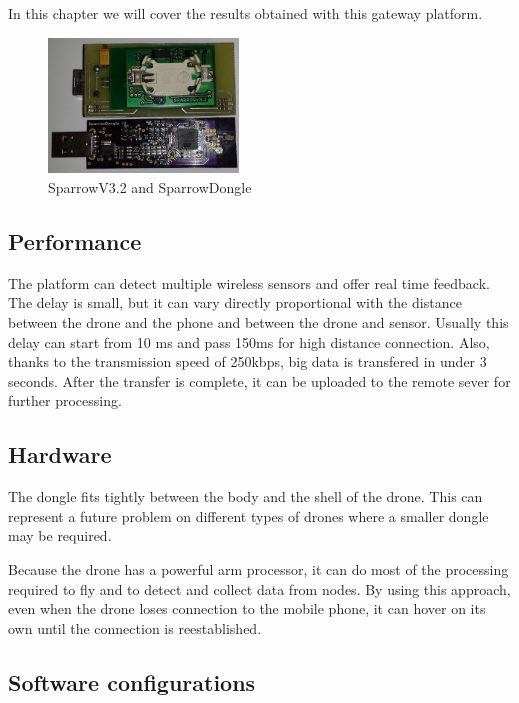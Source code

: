 \label{chap:results}

In this chapter we will cover the results obtained with this gateway platform.

\begin{figure}[ht] \centering
\includegraphics[width=0.45\textwidth]{img/sparrow.jpg} \caption{SparrowV3.2 and SparrowDongle} \end{figure}

 
\subsection{Performance}

The platform can detect multiple wireless sensors and offer real time feedback. 
The delay is small, but it can vary directly proportional with the distance 
between the drone and the phone and between the drone and sensor. Usually this 
delay can start from 10 ms and pass 150ms for high distance connection. Also,
thanks to the transmission speed of 250kbps, big data is transfered in under 3 
seconds. After the transfer is complete, it can be uploaded to the remote sever 
for further processing.
 

\subsection{Hardware}

The dongle fits tightly between the body and the shell of the drone. This can 
represent a future problem on different types of drones where a smaller dongle 
may be required. 

Because the drone has a powerful arm processor, it can do most of the processing 
required to fly and to detect and collect data from nodes. By using this approach,
even when the drone loses connection to the mobile phone, it can hover on its own 
until the connection is reestablished.


\subsection{Software configurations}

